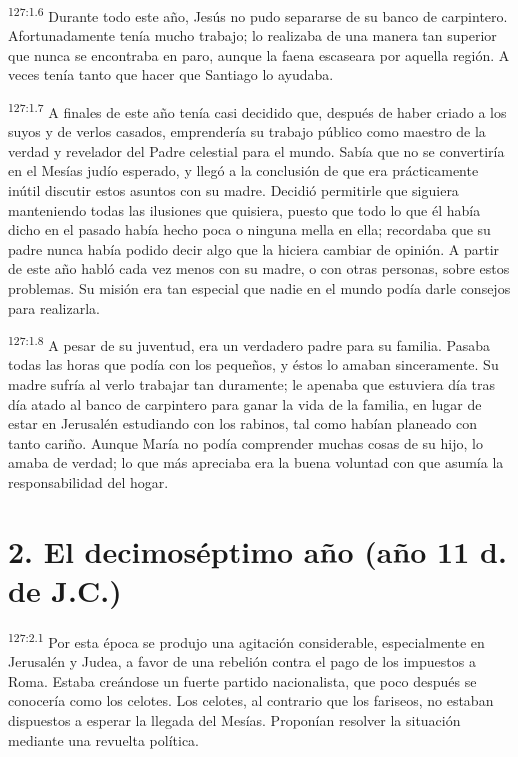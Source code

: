 \par 
\textsuperscript{127:1.6} Durante todo este año, Jesús no pudo separarse de su banco de carpintero. Afortunadamente tenía mucho trabajo; lo realizaba de una manera tan superior que nunca se encontraba en paro, aunque la faena escaseara por aquella región. A veces tenía tanto que hacer que Santiago lo ayudaba.

\par 
\textsuperscript{127:1.7} A finales de este año tenía casi decidido que, después de haber criado a los suyos y de verlos casados, emprendería su trabajo público como maestro de la verdad y revelador del Padre celestial para el mundo. Sabía que no se convertiría en el Mesías judío esperado, y llegó a la conclusión de que era prácticamente inútil discutir estos asuntos con su madre. Decidió permitirle que siguiera manteniendo todas las ilusiones que quisiera, puesto que todo lo que él había dicho en el pasado había hecho poca o ninguna mella en ella; recordaba que su padre nunca había podido decir algo que la hiciera cambiar de opinión. A partir de este año habló cada vez menos con su madre, o con otras personas, sobre estos problemas. Su misión era tan especial que nadie en el mundo podía darle consejos para realizarla.

\par 
\textsuperscript{127:1.8} A pesar de su juventud, era un verdadero padre para su familia. Pasaba todas las horas que podía con los pequeños, y éstos lo amaban sinceramente. Su madre sufría al verlo trabajar tan duramente; le apenaba que estuviera día tras día atado al banco de carpintero para ganar la vida de la familia, en lugar de estar en Jerusalén estudiando con los rabinos, tal como habían planeado con tanto cariño. Aunque María no podía comprender muchas cosas de su hijo, lo amaba de verdad; lo que más apreciaba era la buena voluntad con que asumía la responsabilidad del hogar.

\section*{2. El decimoséptimo año (año 11 d. de J.C.)}
\par 
\textsuperscript{127:2.1} Por esta época se produjo una agitación considerable, especialmente en Jerusalén y Judea, a favor de una rebelión contra el pago de los impuestos a Roma. Estaba creándose un fuerte partido nacionalista, que poco después se conocería como los celotes. Los celotes, al contrario que los fariseos, no estaban dispuestos a esperar la llegada del Mesías. Proponían resolver la situación mediante una revuelta política.

